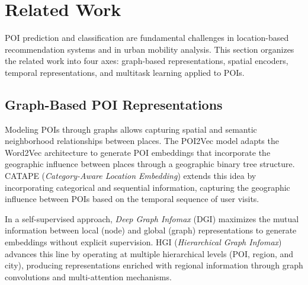 \section{Related Work}
\label{sec:courb:related}

POI prediction and classification are fundamental challenges in location-based recommendation systems and in urban mobility analysis. This section organizes the related work into four axes: graph-based representations, spatial encoders, temporal representations, and multitask learning applied to POIs.

\subsection{Graph-Based POI Representations}

Modeling POIs through graphs allows capturing spatial and semantic neighborhood relationships between places. The POI2Vec model \cite{feng2017poi2vec} adapts the Word2Vec architecture to generate POI embeddings that incorporate the geographic influence between places through a geographic binary tree structure. CATAPE (\textit{Category-Aware Location Embedding}) \cite{rahmani2019category} extends this idea by incorporating categorical and sequential information, capturing the geographic influence between POIs based on the temporal sequence of user visits.

In a self-supervised approach, \textit{Deep Graph Infomax} (DGI) \cite{velickovic2019deep} maximizes the mutual information between local (node) and global (graph) representations to generate embeddings without explicit supervision. HGI (\textit{Hierarchical Graph Infomax}) \cite{huang2023hgi} advances this line by operating at multiple hierarchical levels (POI, region, and city), producing representations enriched with regional information through graph convolutions and multi-attention mechanisms.

